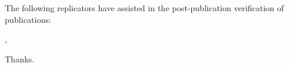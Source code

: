The following replicators have assisted in the post-publication verification of publications:



%
{\firstname\xspace  \initial\xspace \lastname ,}

Thanks.